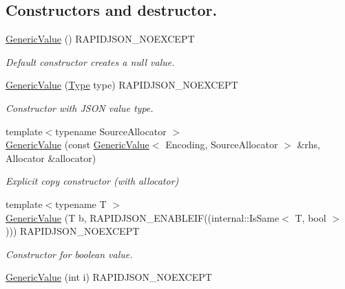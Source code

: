 \subsection*{Constructors and destructor.}
\begin{DoxyCompactItemize}
\item 
\hyperlink{class_generic_value_ab0205d57176d83814ea4e4598c596fe8}{Generic\+Value} () R\+A\+P\+I\+D\+J\+S\+O\+N\+\_\+\+N\+O\+E\+X\+C\+E\+PT\hypertarget{class_generic_value_ab0205d57176d83814ea4e4598c596fe8}{}\label{class_generic_value_ab0205d57176d83814ea4e4598c596fe8}

\begin{DoxyCompactList}\small\item\em Default constructor creates a null value. \end{DoxyCompactList}\item 
\hyperlink{class_generic_value_a83c8f84b8e61f2f40414b703b75aea61}{Generic\+Value} (\hyperlink{rapidjson_8h_a1d1cfd8ffb84e947f82999c682b666a7}{Type} type) R\+A\+P\+I\+D\+J\+S\+O\+N\+\_\+\+N\+O\+E\+X\+C\+E\+PT
\begin{DoxyCompactList}\small\item\em Constructor with J\+S\+ON value type. \end{DoxyCompactList}\item 
{\footnotesize template$<$typename Source\+Allocator $>$ }\\\hyperlink{class_generic_value_a5161c0c98ba9144c50a38acde28a5ede}{Generic\+Value} (const \hyperlink{class_generic_value}{Generic\+Value}$<$ Encoding, Source\+Allocator $>$ \&rhs, Allocator \&allocator)
\begin{DoxyCompactList}\small\item\em Explicit copy constructor (with allocator) \end{DoxyCompactList}\item 
{\footnotesize template$<$typename T $>$ }\\\hyperlink{class_generic_value_a88f02daf621c42b96d49d608fa9214de}{Generic\+Value} (T b, R\+A\+P\+I\+D\+J\+S\+O\+N\+\_\+\+E\+N\+A\+B\+L\+E\+IF((internal\+::\+Is\+Same$<$ T, bool $>$))) R\+A\+P\+I\+D\+J\+S\+O\+N\+\_\+\+N\+O\+E\+X\+C\+E\+PT
\begin{DoxyCompactList}\small\item\em Constructor for boolean value. \end{DoxyCompactList}\item 
\hyperlink{class_generic_value_aafc754ade38421c179f5c8933ecbaf45}{Generic\+Value} (int i) R\+A\+P\+I\+D\+J\+S\+O\+N\+\_\+\+N\+O\+E\+X\+C\+E\+PT\hypertarget{class_generic_value_aafc754ade38421c179f5c8933ecbaf45}{}\label{class_generic_value_aafc754ade38421c179f5c8933ecbaf45}


\end{DoxyCompactItemize}

